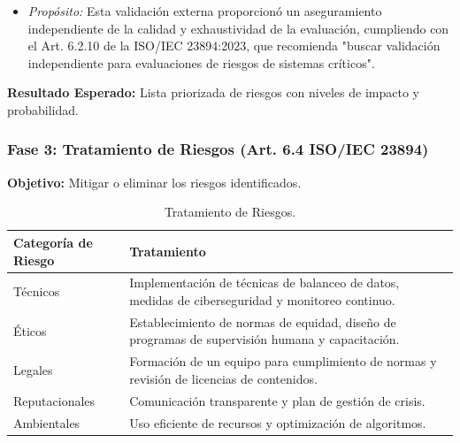 \documentclass[12pt]{article}
\begin{document}
\begin{enumerate}
\begin{itemize}
            \item \textit{Propósito:} Esta validación externa proporcionó un aseguramiento independiente de la calidad y exhaustividad de la evaluación, cumpliendo con el Art. 6.2.10 de la ISO/IEC 23894:2023, que recomienda "buscar validación independiente para evaluaciones de riesgos de sistemas críticos".
        \end{itemize}
\end{enumerate}

\textbf{Resultado Esperado:} Lista priorizada de riesgos con niveles de impacto y probabilidad.

\subsubsection{Fase 3: Tratamiento de Riesgos (Art. 6.4 ISO/IEC 23894)}
\textbf{Objetivo:} Mitigar o eliminar los riesgos identificados.

\begin{table}[h]
    \centering
    \begin{tabular}{p{3cm}p{11cm}}
        \toprule
        \textbf{Categoría de Riesgo} & \textbf{Tratamiento} \\
        \midrule
        Técnicos & Implementación de técnicas de balanceo de datos, medidas de ciberseguridad y monitoreo continuo. \\
        Éticos & Establecimiento de normas de equidad, diseño de programas de supervisión humana y capacitación. \\
        Legales & Formación de un equipo para cumplimiento de normas y revisión de licencias de contenidos. \\
        Reputacionales & Comunicación transparente y plan de gestión de crisis. \\
        Ambientales & Uso eficiente de recursos y optimización de algoritmos. \\
        \bottomrule
    \end{tabular}
    \caption{Tratamiento de Riesgos.}
    \label{tab:tratamiento_riesgos}
\end{table}
\end{document}
